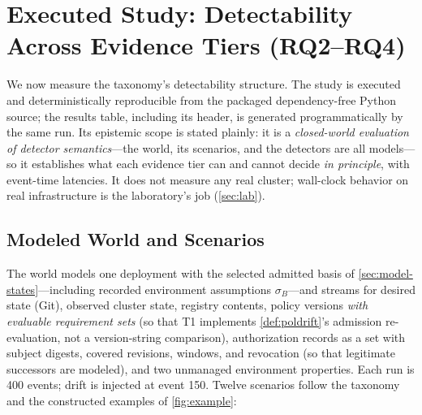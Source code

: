\section{Executed Study: Detectability Across Evidence Tiers (RQ2--RQ4)}
\label{sec:study}

We now measure the taxonomy's detectability structure. The study is executed
and deterministically reproducible from the packaged dependency-free Python
source; the results table, including
its header, is generated programmatically by the same run. Its
epistemic scope is stated plainly: it is a \emph{closed-world evaluation of
detector semantics}---the world, its scenarios, and the detectors are all
models---so it establishes what each evidence tier can and cannot decide
\emph{in principle}, with event-time latencies. It does not measure any real
cluster; wall-clock behavior on real infrastructure is the laboratory's job
(\cref{sec:lab}).

\subsection{Modeled World and Scenarios}
The world models one deployment with the selected admitted basis of
\cref{sec:model-states}---including recorded environment assumptions
$\sigma_B$---and streams for desired state (Git), observed cluster state,
registry contents, policy versions \emph{with evaluable requirement sets}
(so that T1 implements \cref{def:poldrift}'s admission re-evaluation, not a
version-string comparison), authorization records as a set with subject
digests, covered revisions, windows, and revocation (so that legitimate
successors are modeled), and two unmanaged environment properties. Each run
is 400 events; drift is injected at event 150. Twelve scenarios follow the
taxonomy and the constructed examples of \cref{fig:example}:

